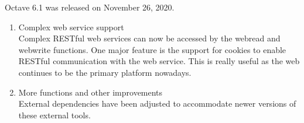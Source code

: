 \documentclass{article}
\begin{document}
\par
Octave 6.1 was released on November 26, 2020.
\begin{enumerate}

    \item Complex web service support\\
    Complex RESTful web services can now be accessed by the webread and webwrite functions. One major feature is the support for cookies to enable RESTful communication with the web service. This is really useful as the web continues to be the primary platform nowadays.

    \item More functions and other improvements\\
    External dependencies have been adjusted to accommodate newer versions of these external tools.

\end{enumerate}

\end{document}
